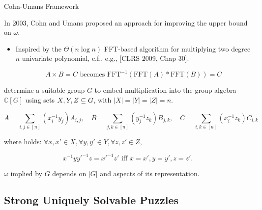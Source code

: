 \documentclass[t,10pt,
mathserif,xcolor=dvipsnames]{beamer}
\begin{document}
\newcommand\FFT{\mathrm{FFT}}
\newcommand\CC{\mathbb{C}}

\begin{myframe}{Cohn-Umans Framework}

  In 2003, Cohn and Umans proposed an approach for improving the upper
  bound on $\omega$.

  \begin{itemize}
  \item Inspired by the $\Theta(n \log n)$ FFT-based algorithm for
    multiplying two degree $n$ univariate polynomial, c.f., e.g.,
    [CLRS 2009, Chap 30].

    $$ A \times B = C\text{ becomes }  \FFT^{-1}(\FFT(A) * \FFT(B)) = C$$

  \end{itemize}

   determine a suitable group $G$ to embed
  multiplication into the group algebra $\CC[G]$ using sets $X, Y, Z
  \subseteq G$, with $|X| = |Y| = |Z| = n$.

  $$\bar{A} = \sum_{i, j \in [n]} (x_i^{-1} y_j) A_{i,j}, \quad \bar{B} =
  \sum_{j, k \in [n]} (y_j^{-1} z_k) B_{j,k}, \quad \bar{C} = \sum_{i, k \in
    [n]} (x_i^{-1} z_k) C_{i,k}$$

  where  holds: $\forall x,x'
  \in X, \forall y,y' \in Y, \forall z,z' \in Z,$

  $$x^{-1} y y'^{-1} z = x'^{-1} z' \text{ iff } x = x', y = y', z =
  z'.$$
  
  $\omega$ implied by $G$ depends on $|G|$ and aspects of its
  representation.
  
\end{myframe}



\subsection{Strong Uniquely Solvable Puzzles}
\end{document}
